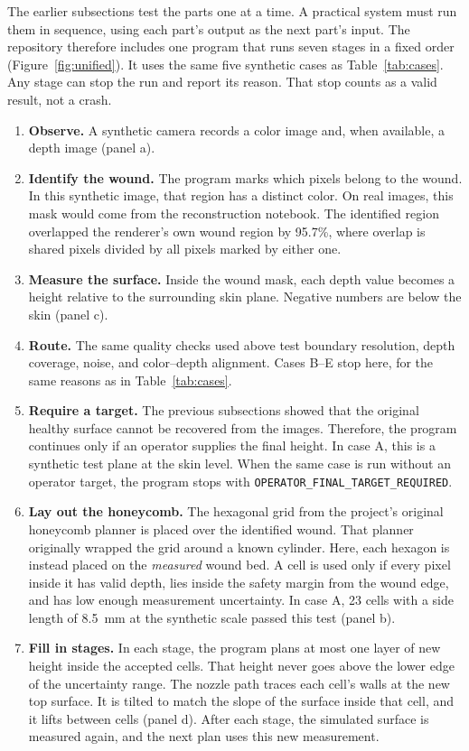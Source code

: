 \documentclass[conference]{IEEEtran}
\begin{document}
The earlier subsections test the parts one at a time. A practical system
must run them in sequence, using each part's output as the next part's input.
The repository therefore includes one program that runs seven stages in a
fixed order (Figure~\ref{fig:unified}). It uses the same five synthetic
cases as Table~\ref{tab:cases}. Any stage can stop the run and report its
reason. That stop counts as a valid result, not a crash.

\begin{enumerate}
\item \textbf{Observe.} A synthetic camera records a color image and, when
available, a depth image (panel a).
\item \textbf{Identify the wound.} The program marks which pixels belong to
the wound. In this synthetic image, that region has a distinct color. On real
images, this mask would come from the reconstruction notebook. The
identified region overlapped the renderer's own wound region by 95.7\%,
where overlap is shared pixels divided by all pixels marked by either one.
\item \textbf{Measure the surface.} Inside the wound mask, each depth value
becomes a height relative to the surrounding skin plane. Negative numbers
are below the skin (panel c).
\item \textbf{Route.} The same quality checks used above test boundary
resolution, depth coverage, noise, and color--depth alignment. Cases B--E
stop here, for the same reasons as in Table~\ref{tab:cases}.
\item \textbf{Require a target.} The previous subsections showed that the
original healthy surface cannot be recovered from the images. Therefore, the
program continues only if an operator supplies the final height. In case A,
this is a synthetic test plane at the skin level. When the same case is run
without an operator target, the program stops with
\texttt{OPERATOR\_FINAL\_TARGET\_REQUIRED}.
\item \textbf{Lay out the honeycomb.} The hexagonal grid from the project's
original honeycomb planner is placed over the identified wound. That planner
originally wrapped the grid around a known cylinder. Here, each hexagon is
instead placed on the \emph{measured} wound bed. A cell is used only if
every pixel inside it has valid depth, lies inside the safety margin from
the wound edge, and has low enough measurement uncertainty. In case A, 23
cells with a side length of 8.5~mm at the synthetic scale passed this test
(panel b).
\item \textbf{Fill in stages.} In each stage, the program plans at most one
layer of new height inside the accepted cells. That height never goes above
the lower edge of the uncertainty range. The nozzle path traces each cell's
walls at the new top surface. It is tilted to match the slope of the surface
inside that cell, and it lifts between cells (panel d). After each stage,
the simulated surface is measured again, and the next plan uses this new
measurement.
\end{enumerate}
\end{document}
